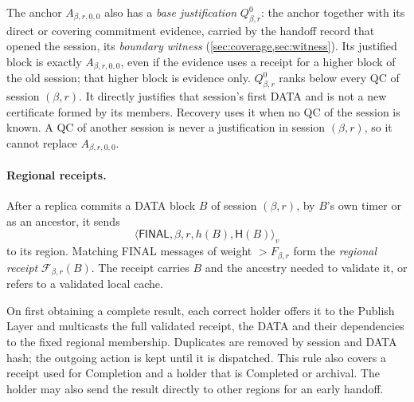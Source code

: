\documentclass[11pt,a4paper]{article}
\newcommand{\FC}{\mathcal F}
\newcommand{\Hash}{\mathsf H}
\newcommand{\tagg}[1]{\ensuremath{\mathsf{#1}}}
\newcommand{\defterm}[1]{\textcolor{rrBlue}{\textit{#1}}}
\begin{document}
The anchor $A_{\beta,r,0,0}$ also has a \defterm{base justification}
$Q_{\beta,r}^0$: the anchor together with its direct or covering
commitment evidence, carried by the handoff record that opened the
session, its \defterm{boundary witness} (\cref{sec:coverage,sec:witness}). Its justified block is exactly
$A_{\beta,r,0,0}$, even if the evidence uses a receipt for a higher
block of the old session; that higher block is evidence only.
$Q_{\beta,r}^0$ ranks below every QC of session $(\beta,r)$.
It directly justifies that session's first DATA and is not a new
certificate formed by its members. Recovery uses it when no QC of the
session is known. A QC of another session is
never a justification in session $(\beta,r)$, so it cannot replace
$A_{\beta,r,0,0}$.

\paragraph{Regional receipts.}
After a replica commits a DATA block $B$ of session $(\beta,r)$, by $B$'s
own timer or as an ancestor, it sends
\[
 \langle\tagg{FINAL},\beta,r,h(B),\Hash(B)\rangle_v
\]
to its region. Matching FINAL messages of weight $>F_{\beta,r}$ form
the \defterm{regional receipt} $\FC_{\beta,r}(B)$. The receipt carries
$B$ and the ancestry needed to validate it, or refers to a validated
local cache.

On first obtaining a complete result, each correct holder offers it to
the Publish Layer and multicasts the full validated receipt, the DATA
and their dependencies to the fixed regional membership. Duplicates are
removed by session and DATA hash; the outgoing action is kept until it
is dispatched. This rule also covers a receipt used for Completion and
a holder that is Completed or archival. The holder may also send the
result directly to other regions for an early handoff.
\end{document}

